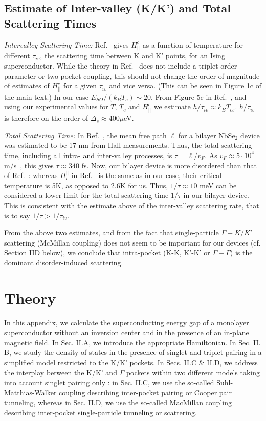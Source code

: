 \documentclass[showpacs,superscriptaddress,onecolumn,prb]{revtex4}
\begin{document}
\FloatBarrier

\subsection{Estimate of Inter-valley (K/K') and Total Scattering Times}\label{partI:scattering}

\textit{Intervalley Scattering Time:} Ref.~\cite{ilic2017} gives $H_{||}^c$ as a function of temperature for different $\tau_{iv}$, the scattering time between K and K' points, for an Ising superconductor. While the theory in Ref.~\cite{ilic2017} does not include a triplet order parameter or two-pocket coupling, this should not change the order of magnitude of estimates of $H_{||}^c$ for a given $\tau_{iv}$ and vice versa. (This can be seen in Figure 1c of the main text.) In our case $E_{SO}/(k_B T_c) \sim 20$. From Figure 5c in Ref.~\cite{ilic2017}, and using our experimental values for $T$, $T_c$ and $H_{||}^c$ we estimate $h/\tau_{iv} \approx k_B T_{cs}$. $h/\tau_{iv}$ is therefore on the order of $\Delta_s \approx 400 \mu$eV. 

\textit{Total Scattering Time:} In Ref.~\cite{barrera2018}, the mean free path $\ell$ for a bilayer NbSe$_2$ device was estimated to be 17 nm from Hall measurements. Thus, the total scattering time, including all intra- and inter-valley processes, is $\tau = \ell/v_F$. As $v_F \approx 5 \cdot 10^4$ m/s~\cite{dvir2018spectroscopy}, this gives $\tau \approx 340$ fs. Now, our bilayer device is more disordered than that of Ref.~\cite{barrera2018}: whereas $H_c^{||}$ in Ref.~\cite{barrera2018} is the same as in our case, their critical temperature is 5K, as opposed to 2.6K for us. Thus, $1/\tau \approx 10$ meV can be considered a lower limit for the total scattering time $1/\tau$ in our bilayer device. This is consistent with the estimate above of the inter-valley scattering rate, that is to say $1/\tau > 1/\tau_{iv}$. 

From the above two estimates, and from the fact that single-particle $\Gamma-K/K'$ scattering (McMillan coupling) does not seem to be important for our devices (cf. Section IID below), we conclude that intra-pocket (K-K, K'-K' or $\Gamma-\Gamma$) is the dominant disorder-induced scattering.


\section{Theory}\label{partII}

In this appendix, we  calculate the superconducting
energy gap of a monolayer superconductor without an inversion
center and in the presence of an in-plane magnetic field.  
In Sec. II.A, we introduce the appropriate Hamiltonian. In Sec. II. B, we study the density of states in the presence of singlet and triplet pairing in a simplified model restricted to the K/K’ pockets. In Secs. II.C \& II.D, we address the interplay between the K/K’ and $\Gamma$ pockets within two different models taking into account singlet pairing only : in Sec. II.C, we use the so-called Suhl-Matthias-Walker coupling describing inter-pocket pairing or Cooper pair tunneling, whereas in Sec. II.D, we use the so-called MacMillan coupling describing inter-pocket single-particle tunneling or scattering.
\end{document}
